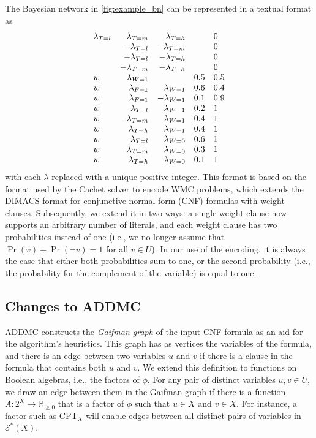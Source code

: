 \documentclass{article}
\theoremstyle{definition}
\theoremstyle{remark}
\begin{document}
{The Bayesian network in \cref{fig:example_bn} can be represented in a textual
format as
\[
  \begin{array}{l r r l l}
    \lambda\sb{T=l} &\lambda\sb{T=m} &\lambda\sb{T=h} & &0 \\
                    &-\lambda\sb{T=l} &-\lambda\sb{T=m} & &0 \\
                    &-\lambda\sb{T=l} &-\lambda\sb{T=h} & &0 \\
                    &-\lambda\sb{T=m} &-\lambda\sb{T=h} & &0 \\
    w &\lambda\sb{W=1} & &0.5 &0.5 \\
    w &\lambda\sb{F=1} &\lambda\sb{W=1} &0.6 &0.4 \\
    w &\lambda\sb{F=1} &-\lambda\sb{W=1} &0.1 &0.9 \\
    w &\lambda\sb{T=l} &\lambda\sb{W=1} &0.2 &1 \\
    w &\lambda\sb{T=m} &\lambda\sb{W=1} &0.4 &1 \\
    w &\lambda\sb{T=h} &\lambda\sb{W=1} &0.4 &1 \\
    w &\lambda\sb{T=l} &\lambda\sb{W=0} &0.6 &1 \\
    w &\lambda\sb{T=m} &\lambda\sb{W=0} &0.3 &1 \\
    w &\lambda\sb{T=h} &\lambda\sb{W=0} &0.1 &1
  \end{array}
\]
with each $\lambda$ replaced with a unique positive integer. This format is
based on the format used by the Cachet solver \cite{DBLP:conf/sat/SangBBKP04}
to encode WMC problems, which extends the DIMACS format for conjunctive normal
form (CNF) formulas with weight clauses. Subsequently, we extend it in two ways:
a single weight clause now supports an arbitrary number of literals, and each
weight clause has two probabilities instead of one (i.e., we no longer assume
that $\Pr(v) + \Pr(\neg v) = 1$ for all $v \in U$). In our use of the encoding,
it is always the case that either both probabilities sum to one, or the second
probability (i.e., the probability for the complement of the variable) is equal
to one.

\subsection{Changes to ADDMC}

ADDMC constructs the \emph{Gaifman graph} \cite{gaifman1982local} of the input
CNF formula as an aid for the algorithm's heuristics. This graph has as vertices
the variables of the formula, and there is an edge between two variables $u$ and
$v$ if there is a clause in the formula that contains both $u$ and $v$. We
extend this definition to functions on Boolean algebras, i.e., the factors of
$\phi$. For any pair of distinct variables $u, v \in U$, we draw an edge between
them in the Gaifman graph if there is a function $A\colon 2^X \to
\mathbb{R}_{\ge 0}$ that is a factor of $\phi$ such that $u \in X$ and $v \in
X$. For instance, a factor such as $\mathrm{CPT}_X$ will enable edges between
all distinct pairs of variables in $\mathcal{E}^*(X)$.

}
\end{document}
